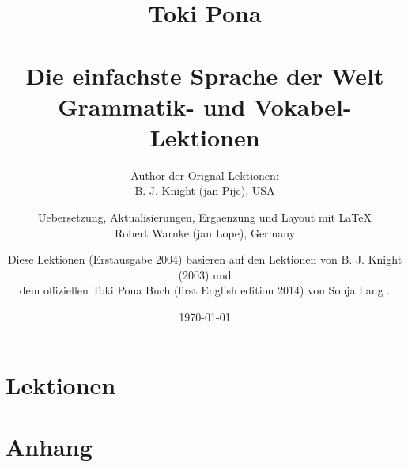 \documentclass[a4paper, 10pt]{book}
\begin{document}
\setlength{\topmargin}{-19mm}
\setlength{\headheight}{5mm}
\setlength{\headsep}{10mm}
\setlength{\textheight}{245mm}
\setlength{\textwidth}{155mm}
\setlength{\oddsidemargin}{5mm}
\setlength{\evensidemargin}{-1mm}
\setlength{\footskip}{20mm}
\setlength{\parindent}{0mm}
\setlength{\parskip}{2.0ex plus 1.0ex minus 0.5ex}
\batchmode
\title{
Toki Pona \\ \\ 
Die einfachste Sprache der Welt \\
Grammatik- und Vokabel-Lektionen \\
}
\author{
Author der Orignal-Lektionen: \\ B. J. Knight (jan Pije), USA \cite{www:Pije:01} \\  
\and
Uebersetzung, Aktualisierungen, Ergaenzung und Layout mit \LaTeX \\ Robert Warnke (jan Lope), Germany \cite{www:rowa:01} \\ 
\and
Diese Lektionen (Erstausgabe 2004) basieren auf den Lektionen von B. J. Knight (2003) und \\  
dem offiziellen Toki Pona Buch (first English edition 2014) von Sonja Lang \cite{www:tokipona.org}. 
}


%
\date
\today
\maketitle
\tableofcontents
%
\chapter{Lektionen}






















%
\appendix
\chapter{Anhang}
%
%







%


\printindex
\end{document}
